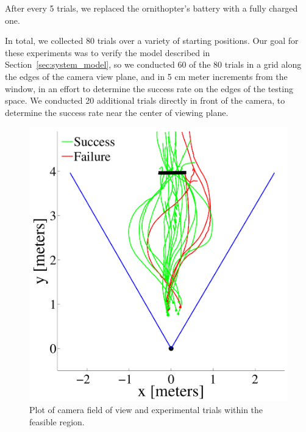 \documentclass{aamas2013}
\begin{document}
After every 5 trials, we replaced the ornithopter's battery with a fully 
charged one.

In total, we collected 80 trials over a variety of starting positions. Our 
goal for these experiments was to verify the model described in 
Section~\ref{sec:system_model}, so we conducted 60 of the 80 trials in a 
grid along the edges of the camera view plane, and in 5 cm meter increments 
from the window, in an effort to determine the success rate on the edges of 
the testing space. We conducted 20 additional trials directly in front of 
the camera, to determine the success rate near the center of viewing plane.

\begin{figure}[tb]
\begin{minipage}[b]{0.45\linewidth}
\centering
\includegraphics[width=\linewidth]{figures/flight_paths_feasible.pdf}
\caption{Plot of camera field of view and experimental trials within the feasible region.}
\label{fig:flight_paths_feasible}
\end{minipage}
\hfill
\begin{minipage}[b]{0.45\linewidth}
\centering

\end{minipage}
\end{figure}
\end{document}
